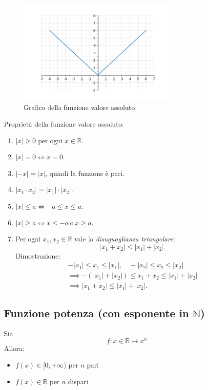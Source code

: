 \begin{figure}[h]
    \centering
    \includegraphics[width=0.7\textwidth]{./img/funzione_valore_assoluto.png}
    \caption{Grafico della funzione valore assoluto}
    \label{fig:funzione_valore_assoluto}
\end{figure}


  

Proprietà della funzione valore assoluto:
\begin{enumerate}
    \item $|x| \ge 0$ per ogni $x \in \mathbb{R}$.
    \item $|x| = 0 \iff x = 0$.
    \item $|-x| = |x|$, quindi la funzione è pari.
    \item $|x_1 \cdot x_2| = |x_1| \cdot |x_2|$.
    \item $|x| \le a \iff -a \le x \le a$.
    \item $|x| \ge a \iff x \le -a \ \text{o} \ x \ge a$.
    \item Per ogni $x_1, x_2 \in \mathbb{R}$ vale la \emph{disuguaglianza triangolare}:
    \[
    |x_1 + x_2| \le |x_1| + |x_2|.
    \]
    Dimostrazione:
    \begin{align*}
    -|x_1| \le x_1 \le |x_1|, \quad -|x_2| \le x_2 \le |x_2| \\
    \implies -(|x_1| + |x_2|) \le x_1 + x_2 \le |x_1| + |x_2| \\
    \implies |x_1 + x_2| \le |x_1| + |x_2|.
    \end{align*}
  \end{enumerate}
\subsection{Funzione potenza (con esponente in $\mathbb{N}$)}

Sia
\[
f: x \in \mathbb{R} \mapsto x^n
\]
Allora:
\begin{itemize}
  \item $f(x) \in [0, +\infty)$ per $n$ pari
  \item $f(x) \in \mathbb{R}$ per $n$ dispari
\end{itemize}

